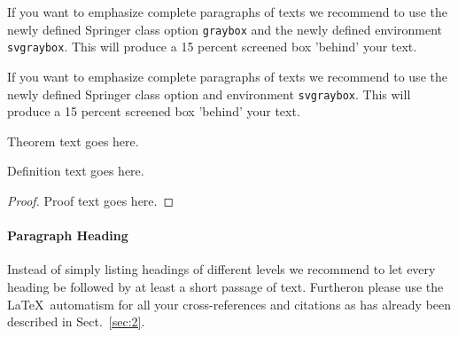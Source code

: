 \begin{svgraybox}
	If you want to emphasize complete paragraphs of texts we recommend to use the newly defined Springer class option \verb|graybox| and the newly defined environment \verb|svgraybox|. This will produce a 15 percent screened box 'behind' your text.

	If you want to emphasize complete paragraphs of texts we recommend to use the newly defined Springer class option and environment \verb|svgraybox|. This will produce a 15 percent screened box 'behind' your text.
\end{svgraybox}

\begin{theorem}
	Theorem text goes here.
\end{theorem}

\begin{definition}
	Definition text goes here.
\end{definition}

\begin{proof}
	Proof text goes here.
\end{proof}

\paragraph{Paragraph Heading} %
Instead of simply listing headings of different levels we recommend to let every heading be followed by at least a short passage of text. Furtheron please use the \LaTeX\ automatism for all your cross-references and citations as has already been described in Sect.~\ref{sec:2}.

